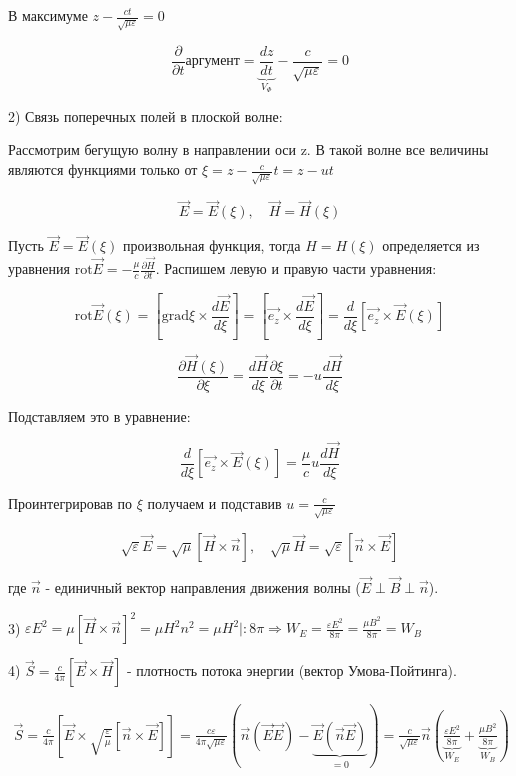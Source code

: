 \documentclass[12pt, a4paper]{report}
\begin{document}
В максимуме \( \displaystyle z - \frac{c t}{ \sqrt{ \mu \varepsilon}} = 0   \) 

\[ \displaystyle \frac{\partial}{\partial t} \text{аргумент}=   \underbrace{\frac{dz}{dt} }_{V_{\Phi }  }- \frac{c}{\sqrt{ \mu \varepsilon}}=0   \] 

2) Связь поперечных полей в плоской волне: 

Рассмотрим бегущую волну в направлении оси z. В такой волне все величины являются функциями только от \(\displaystyle  \xi= z- \frac{c}{\sqrt{\mu \varepsilon } }t = z- ut   \) 

\[ \vec{E}= \vec{E}(\xi ) , \quad \vec{H}=\vec{H}(\xi ) \] 

Пусть \( \vec{E}= \vec{E}(\xi ) \)  произвольная функция, тогда  \(  H=H(\xi ) \) определяется из уравнения \( \displaystyle \mathrm{rot}\vec{E}= - \frac{\mu}{c} \frac{\partial \vec{H}}{\partial t}    \). Распишем левую и правую части уравнения:

\[ \mathrm{rot} \vec{E}(\xi )= \left[ \mathrm{grad} \xi \times  \frac{d \vec{E}}{d \xi }     \right]= [\vec{e_z}\times \frac{d \vec{E}}{d \xi }] = \frac{d}{d \xi  } [\vec{e_z}\times  \vec{E}(\xi )]   \] 

\[ \frac{\partial \vec{H}(\xi )}{\partial\xi }= \frac{d \vec{H}}{d\xi } \frac{\partial \xi }{\partial t}   = - u \frac{d \vec{H}}{d \xi } \] 

Подставляем это в уравнение:

\[ 
\frac{d}{d \xi} [\vec{e_z} \times \vec{E}(\xi)] = \frac{\mu}{c} u \frac{d \vec{H}}{d \xi} 
\]

Проинтегрировав по \( \xi \) получаем и подставив \( \displaystyle u=\frac{c}{\sqrt{\mu \varepsilon }} \) 


\[ \displaystyle  \sqrt{\varepsilon} \vec{E} = \sqrt{ \mu} [\vec{H}\times \vec{n}], \quad \sqrt{\mu} \vec{H} = \sqrt{ \varepsilon} [\vec{n}\times \vec{E}] \]

где \( \vec{n } \) - единичный вектор направления движения волны (\(  \vec{E} \perp \vec{B} \perp \vec{n} \)). 

3) \( \displaystyle \varepsilon E ^2 = \mu [ \displaystyle \vec{H}\times  \vec{n }] ^2 = \mu H ^2 n ^2 = \mu H ^2 | : 8 \pi \Rightarrow W_E = \frac{\varepsilon E ^2 }{8 \pi} =\frac{\mu B ^2 }{8 \pi} = W_B  \) 

4) \( \displaystyle \vec{S}= \frac{c}{4 \pi}   [ \vec{E}\times \vec{H }] \) - плотность потока энергии (вектор Умова-Пойтинга). 

\begin{gather*}
    \displaystyle \vec{S} = \frac{c}{4 \pi} [\vec{E } \times  \sqrt{\frac{\varepsilon}{\mu} }[\vec{n }\times  \vec{E}]]= \frac{c \varepsilon}{4 \pi \sqrt{ \mu \varepsilon}} \left( \vec{n}( \vec{E}\vec{E}) - \underbrace{\vec{E}( \vec{n }\vec{E})}_{=0}   \right)= \frac{c}{\sqrt{ \mu \varepsilon}} \vec{n} \left( \underbrace{\frac{\varepsilon E ^2 }{8 \pi}}_{W_E}  +\underbrace{\frac{\mu B ^2 }{8 \pi}  }_{W_B}  \right)   
\end{gather*}
\end{document}
